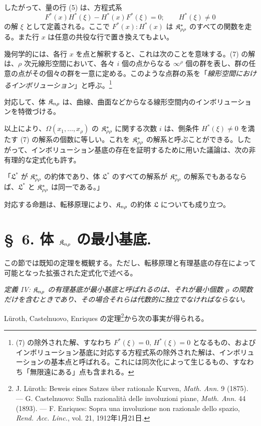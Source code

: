 \documentclass[11pt]{article}
\begin{document}
したがって、量の行 (5) は、方程式系
\[
  F^*(x)H^*(\xi)-H^*(x)F^*(\xi)=0;
  \qquad H^*(\xi)\ne0
\]
の解 $\xi$ として定義される。ここで $F^*(x):H^*(x)$ は $\mathfrak{K}^*_{\rho\rho}$ のすべての関数を走る。また行 $x$ は任意の共役な行で置き換えてもよい。

幾何学的には、各行 $x$ を点と解釈すると、これは次のことを意味する。(7) の解は、$\rho$ 次元線形空間において、各々 $i$ 個の点からなる $\infty^\rho$ 個の群を表し、群の任意の点がその個々の群を一意に定める。このような点群の系を「\emph{線形空間におけるインボリューション}」と呼ぶ。\footnote{(7) の除外された解、すなわち $F^*(\xi)=0$, $H^*(\xi)=0$ となるもの、およびインボリューション基底に対応する方程式系の除外された解は、インボリューションの基本点と呼ばれる。これには同次化によって生じるもの、すなわち「無限遠にある」点も含まれる。}

対応して、体 $\mathfrak{K}_{n\rho}$ は、曲線、曲面などからなる線形空間内のインボリューションを特徴づける。

以上により、$\Omega(x_1,\ldots,x_\rho)$ の $\mathfrak{K}^*_{\rho\rho}$ に関する次数 $i$ は、側条件 $H^*(\xi)\ne0$ を満たす (7) の解系の個数に等しい。これを $\mathfrak{K}^*_{\rho\rho}$ の解系と呼ぶことができる。したがって、インボリューション基底の存在を証明するために用いた議論は、次の非有理的な定式化も許す。

「$\mathfrak{L}^*$ が $\mathfrak{K}^*_{\rho\rho}$ の約体であり、体 $\mathfrak{L}^*$ のすべての解系が $\mathfrak{K}^*_{\rho\rho}$ の解系でもあるならば、$\mathfrak{L}^*$ と $\mathfrak{K}^*_{\rho\rho}$ は同一である。」

対応する命題は、転移原理により、$\mathfrak{K}_{n\rho}$ の約体 $\mathfrak{L}$ についても成り立つ。

\section*{\S\ 6. 体 $\mathfrak{K}_{n\rho}$ の最小基底.}

この節では既知の定理を概観する。ただし、転移原理と有理基底の存在によって可能となった拡張された定式化で述べる。

\emph{定義 IV: $\mathfrak{K}_{n\rho}$ の有理基底が最小基底と呼ばれるのは、それが最小個数 $\rho$ の関数だけを含むときであり、その場合それらは代数的に独立でなければならない。}

Lüroth, Castelnuovo, Enriques の定理\footnote{J. Lüroth: Beweis eines Satzes über rationale Kurven, \emph{Math. Ann.} 9 (1875). --- G. Castelnuovo: Sulla razionalità delle involuzioni piane, \emph{Math. Ann.} 44 (1893). --- F. Enriques: Sopra una involuzione non razionale dello spazio, \emph{Rend. Acc. Linc.}, vol. 21, 1912年1月21日.}から次の事実が得られる。
\end{document}
